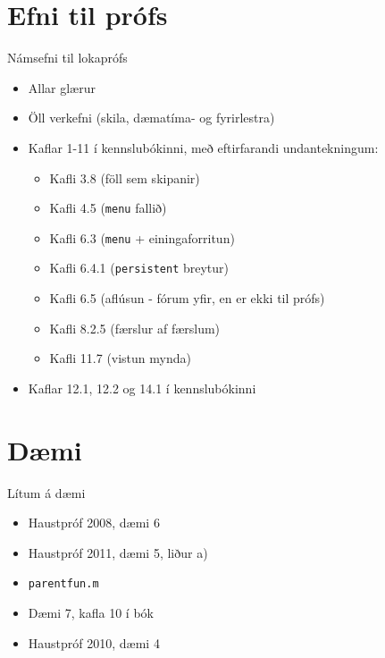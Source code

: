 \documentclass{beamer}
\begin{document}
\section{Efni til prófs}

\begin{frame}{Námsefni til lokaprófs}
\begin{itemize}
 \item Allar glærur
 \item Öll verkefni (skila, dæmatíma- og fyrirlestra)
 \item Kaflar 1-11 í kennslubókinni, með eftirfarandi undantekningum:
 \begin{itemize}
  \item Kafli 3.8 (föll sem skipanir)
  \item Kafli 4.5 (\texttt{menu} fallið)
  \item Kafli 6.3 (\texttt{menu} + einingaforritun)
  \item Kafli 6.4.1 (\texttt{persistent} breytur)
  \item Kafli 6.5 (aflúsun - fórum yfir, en er ekki til prófs)
  \item Kafli 8.2.5 (færslur af færslum)
  \item Kafli 11.7 (vistun mynda)
 \end{itemize}
 \item Kaflar 12.1, 12.2 og 14.1 í kennslubókinni  
\end{itemize}
\end{frame}

\section{Dæmi}

\begin{frame}{Lítum á dæmi}
\begin{itemize}
 \item Haustpróf 2008, dæmi 6
 \item Haustpróf 2011, dæmi 5, liður a)
 \item \texttt{parentfun.m}
 \item Dæmi 7, kafla 10 í bók
 \item Haustpróf 2010, dæmi 4
\end{itemize}

\end{frame}
\end{document}
